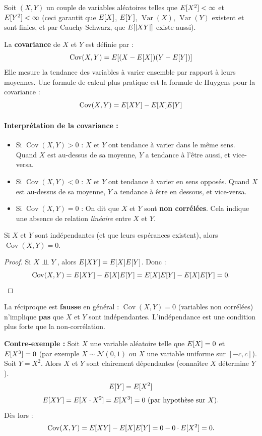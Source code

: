 Soit $(X, Y)$ un couple de variables aléatoires telles que $E[X^2] < \infty$ et $E[Y^2] < \infty$ (ceci garantit que $E[X]$, $E[Y]$, $\operatorname{Var}(X)$, $\operatorname{Var}(Y)$ existent et sont finies, et par Cauchy-Schwarz, que $E[|XY|]$ existe aussi).

\begin{definition}[Covariance]
La \textbf{covariance} de $X$ et $Y$ est définie par :
\[ \operatorname{Cov}(X, Y) = E[(X - E[X])(Y - E[Y])] \]
Elle mesure la tendance des variables à varier ensemble par rapport à leurs moyennes. Une formule de calcul plus pratique est la formule de Huygens pour la covariance :
\[ \operatorname{Cov}(X, Y) = E[XY] - E[X]E[Y] \]
\end{definition}

\paragraph{Interprétation de la covariance :}
\begin{itemize}
    \item Si $\operatorname{Cov}(X, Y) > 0$ : $X$ et $Y$ ont tendance à varier dans le même sens. Quand $X$ est au-dessus de sa moyenne, $Y$ a tendance à l'être aussi, et vice-versa.
    \item Si $\operatorname{Cov}(X, Y) < 0$ : $X$ et $Y$ ont tendance à varier en sens opposés. Quand $X$ est au-dessus de sa moyenne, $Y$ a tendance à être en dessous, et vice-versa.
    \item Si $\operatorname{Cov}(X, Y) = 0$ : On dit que $X$ et $Y$ sont \textbf{non corrélées}. Cela indique une absence de relation \textit{linéaire} entre $X$ et $Y$.
\end{itemize}
\begin{proposition}
Si $X$ et $Y$ sont indépendantes (et que leurs espérances existent), alors $\operatorname{Cov}(X, Y) = 0$.
\end{proposition}

\begin{proof}
Si $X \mathrel{\perp\!\!\!\perp} Y$, alors $E[XY] = E[X]E[Y]$. Donc :
\[
\operatorname{Cov}(X, Y) = E[XY] - E[X]E[Y] = E[X]E[Y] - E[X]E[Y] = 0.
\]
\end{proof}

\begin{remarque}
La réciproque est \textbf{fausse} en général : $\operatorname{Cov}(X, Y) = 0$ (variables non corrélées) n'implique \textbf{pas} que $X$ et $Y$ sont indépendantes. L'indépendance est une condition plus forte que la non-corrélation.

\vspace{0.5em}
\noindent \textbf{Contre-exemple :} Soit $X$ une variable aléatoire telle que $E[X] = 0$ et $E[X^3] = 0$ (par exemple $X \sim \mathcal{N}(0, 1)$ ou $X$ une variable uniforme sur $[-c, c]$). Soit $Y = X^2$. Alors $X$ et $Y$ sont clairement dépendantes (connaître $X$ détermine $Y$). 
\[ E[Y] = E[X^2] \]
\[ E[XY] = E[X \cdot X^2] = E[X^3] = 0 \text{ (par hypothèse sur } X). \]
Dès lors :
\[ \operatorname{Cov}(X, Y) = E[XY] - E[X]E[Y] = 0 - 0 \cdot E[X^2] = 0. \]
\end{remarque}